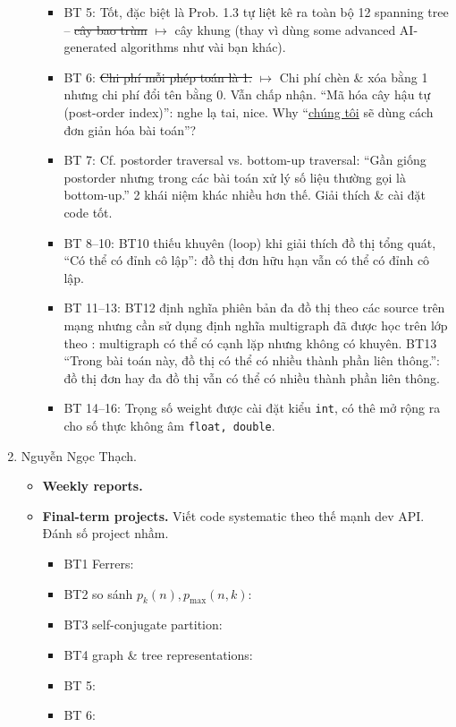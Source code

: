 \documentclass{article}
\begin{document}
\begin{enumerate}
\begin{itemize}
\begin{itemize}
            \item BT 5: Tốt, đặc biệt là Prob. 1.3 tự liệt kê ra toàn bộ 12 spanning tree -- \st{cây bao trùm} $\mapsto$ cây khung (thay  vì dùng some advanced AI-generated algorithms như vài bạn khác).
            \item BT 6: \st{Chi phí mỗi phép toán là 1.} $\mapsto$ Chi phí chèn \& xóa bằng 1 nhưng chi phí đổi tên bằng 0. Vẫn chấp nhận. ``Mã hóa cây hậu tự (post-order index)'': nghe lạ tai, nice. Why ``\underline{chúng tôi} sẽ dùng cách đơn giản hóa bài toán''?
            \item BT 7: Cf. postorder traversal vs. bottom-up traversal: ``Gần giống postorder nhưng trong các bài toán xử lý số liệu thường gọi là bottom-up.'' 2 khái niệm khác nhiều hơn thế. Giải thích \& cài đặt code tốt.
            \item BT 8--10: BT10 thiếu khuyên (loop) khi giải thích đồ thị tổng quát, ``Có thể có đỉnh cô lập'': đồ thị đơn hữu hạn vẫn có thể có đỉnh cô lập.
            \item BT 11--13: BT12 định nghĩa phiên bản đa đồ thị theo các source trên mạng nhưng cần sử dụng định nghĩa multigraph đã được học trên lớp theo \cite{Shahriari2022}: multigraph có thể có cạnh lặp nhưng không có khuyên. BT13 ``Trong bài toán này, đồ thị có thể có nhiều thành phần liên thông.'': đồ thị đơn hay đa đồ thị vẫn có thể có nhiều thành phần liên thông.
            \item BT 14--16: Trọng số weight được cài đặt kiểu {\tt int}, có thê mở rộng ra cho số thực không âm {\tt float, double}.
        \end{itemize}
    \end{itemize}
    \item {\sc Nguyễn Ngọc Thạch.}
    \begin{itemize}
        \item {\bf Weekly reports.}
        \item {\bf Final-term projects.} Viết code systematic theo thế mạnh dev API. Đánh số project nhầm.
        \begin{itemize}
            \item BT1 Ferrers:
            \item BT2 so sánh $p_k(n),p_{\max}(n,k)$:
            \item BT3 self-conjugate partition:
            \item BT4 graph \& tree representations:
            \item BT 5:
            \item BT 6:

\end{itemize}
\end{itemize}
\end{enumerate}
\end{document}
